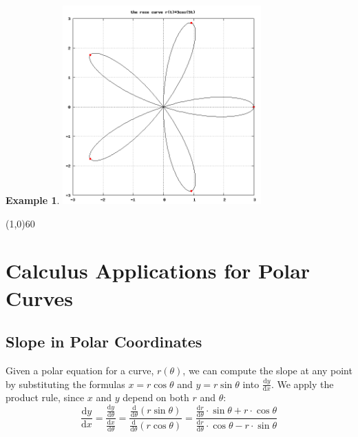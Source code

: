 \documentclass[10.5pt,twoside]{report}
\theoremstyle{definition}
\newtheorem{exmp}{Example}[section]
\begin{document}
\begin{exmp}
\includegraphics[width=3in]{example_5_3_5_2}


\end{exmp}

\line(1,0){60}
\linethickness{0.5mm}

\pagebreak


\section{Calculus Applications for Polar Curves}\label{Calculus Applications for Polar Curves}

\subsection{Slope in Polar Coordinates}

Given a polar equation for a curve, $r(\theta)$, we can compute the slope at any point by substituting the formulas $x=r\cos \theta$ and $y=r\sin \theta$ into $\frac{\mathrm{d}y}{\mathrm{d}x}$.  We apply the product rule, since $x$ and $y$ depend on both $r$ and $\theta$:\\
\[\frac{\mathrm{d}y}{\mathrm{d}x} = \frac{\frac{\mathrm{d}y}{\mathrm{d}\theta}}{\frac{\mathrm{d}x}{\mathrm{d}\theta}} =\frac {\frac{\mathrm{d}}{\mathrm{d}\theta}(r\sin \theta)}{\frac{\mathrm{d}}{\mathrm{d}\theta}(r\cos \theta)}=
\frac{\frac{\mathrm{d}r}{\mathrm{d}\theta}\cdot \sin\theta+r\cdot \cos \theta}
{\frac{\mathrm{d}r}{\mathrm{d}\theta}\cdot \cos \theta-r\cdot \sin \theta}\]

${}$\\
\end{document}
